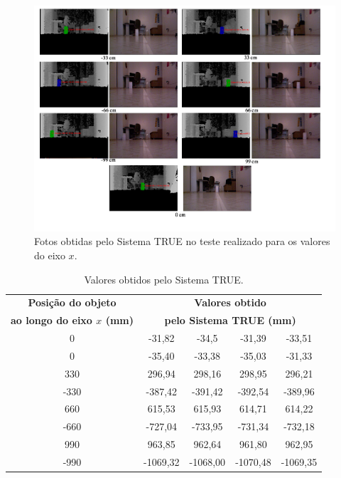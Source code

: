 	\begin{figure}[htb]
		\begin{center}
			\includegraphics[scale=0.55]{figuras/5.Testes/eixox-imgs.png}
		\end{center}
		\caption{Fotos obtidas pelo Sistema TRUE no teste realizado para os valores do eixo $\displaystyle x$.}
		\label{fig:eixox-imgs}
	\end{figure}

	\begin{table}[h]
		\begin{center}
			\caption{Valores obtidos pelo Sistema TRUE.}
			\label{tab:valores-x}
			\begin{tabular}{|c|c|c|c|c|}
				\hline \bf Posição do objeto & \multicolumn{4}{|c|}{\bf Valores obtido}\\
							 \bf ao longo do eixo $\displaystyle x$ (mm) & \multicolumn{4}{|c|}{\bf pelo Sistema TRUE (mm)}\\
				\hline
				\hline 0    & -31,82   & -34,5    & -31,39   & -33,51 \\
				\hline 0    & -35,40   & -33,38   & -35,03   & -31,33  \\
				\hline 330  & 296,94   & 298,16   & 298,95   & 296,21 \\
				\hline -330 & -387,42  & -391,42  & -392,54  & -389,96 \\
				\hline 660  & 615,53   & 615,93   & 614,71   & 614,22 \\
				\hline -660 & -727,04  & -733,95  & -731,34  & -732,18 \\
				\hline 990  & 963,85   & 962,64   & 961,80   & 962,95 \\
				\hline -990 & -1069,32 & -1068,00 & -1070,48 & -1069,35 \\
				\hline
			\end{tabular}
		\end{center}
	\end{table}


